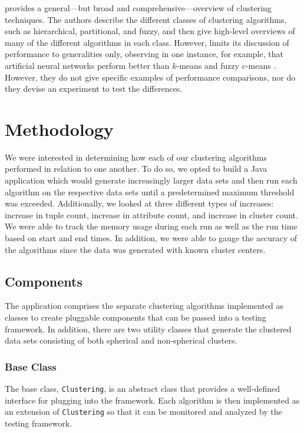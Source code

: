 \documentclass[11pt,letterpaper]{article}
\begin{document}
\cite{Jain99} provides a general---but broad and comprehensive---overview of clustering techniques.  The authors describe the different classes of clustering algorithms, such as hierarchical, partitional, and fuzzy, and then give high-level overviews of many of the different algorithms in each class.  However, \cite{Jain99} limits its discussion of performance to generalities only, observing in one instance, for example, that artificial neural networks perform better than $k$-means and fuzzy $c$-means \cite{Jain99}.  However, they do not give specific examples of performance comparisons, nor do they devise an experiment to test the differences.

\section{Methodology}
We were interested in determining how each of our clustering algorithms performed in relation to one another.  To do so, we opted to build a Java application which would generate increasingly larger data sets and then run each algorithm on the respective data sets until a predetermined maximum threshold was exceeded.  Additionally, we looked at three different types of increases:  increase in tuple count, increase in attribute count, and increase in cluster count.  We were able to track the memory usage during each run as well as the run time based on start and end times.  In addition, we were able to gauge the accuracy of the algorithms since the data was generated with known cluster centers.

\subsection{Components}
The application comprises the separate clustering algorithms implemented as classes to create pluggable components that can be passed into a testing framework.  In addition, there are two utility classes that generate the clustered data sets consisting of both spherical and non-spherical clusters.

\subsubsection{Base Class}
The base class, \verb+Clustering+, is an abstract class that provides a well-defined interface for plugging into the framework.  Each algorithm is then implemented as an extension of \verb+Clustering+ so that it can be monitored and analyzed by the testing framework.
\end{document}
